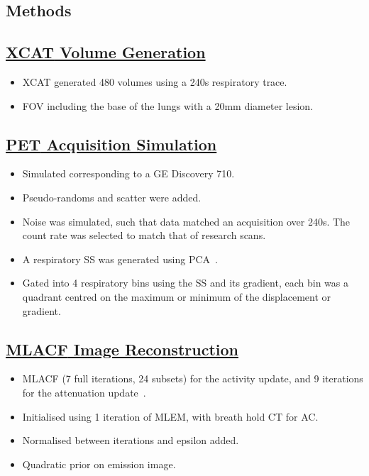 \documentclass[portrait, color=UCLburgundy, margin=1cm]{uclposter}
\begin{document}
    \begin{multicols}{2}
        \section*{Methods}
            \subsection*{\underline{\textbf{\acrshort{XCAT} Volume Generation}}}
                \begin{itemize}
                    \item \acrshort{XCAT} generated 480 volumes using a 240s respiratory trace.
                    \item \acrshort{FOV} including the base of the lungs with a 20mm diameter lesion.
                \end{itemize}
            
            \subsection*{\underline{\textbf{\acrshort{PET} Acquisition Simulation}}}
                \begin{itemize}
                    \item Simulated corresponding to a \acrshort{GE} Discovery 710.
                    \item Pseudo-randoms and scatter were added.
                    \item Noise was simulated, such that data matched an acquisition over 240s. The count rate was selected to match that of research scans.
                    \item A respiratory \gls{SS} was generated using \acrshort{PCA}~\cite{Thielemans2011}.
                    \item Gated into 4 respiratory bins using the \gls{SS} and its gradient, each bin was a quadrant centred on the maximum or minimum of the displacement or gradient.
                \end{itemize}
            
            \subsection*{\underline{\textbf{\acrshort{MLACF} Image Reconstruction}}}
                \begin{itemize}
                    \item \acrshort{MLACF} (7 full iterations, 24 subsets) for the activity update, and 9 iterations for the attenuation update~\cite{Nuyts2012ML-reconstructionFactors}.
                    \item Initialised using 1 iteration of \acrshort{MLEM}, with breath hold \acrshort{CT} for \acrshort{AC}.
                    \item Normalised between iterations and epsilon added.
                    \item Quadratic prior on emission image.
                \end{itemize}
            

\end{multicols}
\end{document}
